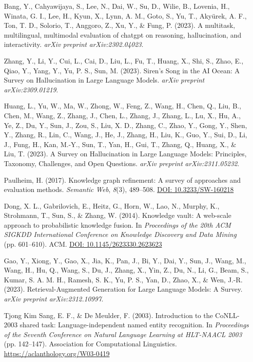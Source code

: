 \documentclass{article}
\begin{document}
\begin{thebibliography}{99}
Bang, Y., Cahyawijaya, S., Lee, N., Dai, W., Su, D., Wilie, B., Lovenia, H., Winata, G. I., Lee, H., Kyun, X., Lynn, A. M., Goto, S., Yu, T., Akyürek, A. F., Ton, T. D., Solorio, T., Anggoro, Z., Xu, Y., \& Fung, P. (2023).
A multitask, multilingual, multimodal evaluation of chatgpt on reasoning, hallucination, and interactivity.
\textit{arXiv preprint arXiv:2302.04023}.

Zhang, Y., Li, Y., Cui, L., Cai, D., Liu, L., Fu, T., Huang, X., Shi, S., Zhao, E., Qiao, Y., Yang, Y., Yu, P. S., Sun, M. (2023).
Siren's Song in the {AI} Ocean: A Survey on Hallucination in Large Language Models.
\textit{arXiv preprint arXiv:2309.01219}.

Huang, L., Yu, W., Ma, W., Zhong, W., Feng, Z., Wang, H., Chen, Q., Liu, B., Chen, M., Wang, Z., Zhang, J., Chen, L., Zhang, J., Zhang, L., Lu, X., Hu, A., Ye, Z., Du, Y., Sun, J., Zou, S., Liu, X. D., Zhang, C., Zhao, Y., Gong, Y., Shen, Y., Zhang, R., Lin, C., Wang, J., He, J., Zhang, H., Liu, K., Guo, Y., Sui, D., Li, J., Fung, H., Kan, M.-Y., Sun, T., Yan, H., Gui, T., Zhang, Q., Huang, X., \& Liu, T. (2023).
A Survey on Hallucination in Large Language Models: Principles, Taxonomy, Challenges, and Open Questions.
\textit{arXiv preprint arXiv:2311.05232}.

Paulheim, H. (2017).
Knowledge graph refinement: A survey of approaches and evaluation methods.
\textit{Semantic Web}, \textit{8}(3), 489--508.
\href{https://doi.org/10.3233/SW-160218}{DOI: 10.3233/SW-160218}

Dong, X. L., Gabrilovich, E., Heitz, G., Horn, W., Lao, N., Murphy, K., Strohmann, T., Sun, S., \& Zhang, W. (2014).
Knowledge vault: A web-scale approach to probabilistic knowledge fusion.
In \textit{Proceedings of the 20th ACM SIGKDD International Conference on Knowledge Discovery and Data Mining} (pp. 601--610). ACM.
\href{https://doi.org/10.1145/2623330.2623623}{DOI: 10.1145/2623330.2623623}

Gao, Y., Xiong, Y., Gao, X., Jia, K., Pan, J., Bi, Y., Dai, Y., Sun, J., Wang, M., Wang, H., Hu, Q., Wang, S., Du, J., Zhang, X., Yin, Z., Du, N., Li, G., Beam, S., Kumar, S. A. M. H., Ramesh, S. K., Yu, P. S., Yan, D., Zhao, X., \& Wen, J.-R. (2023).
Retrieval-Augmented Generation for Large Language Models: A Survey.
\textit{arXiv preprint arXiv:2312.10997}.

Tjong Kim Sang, E. F., \& De Meulder, F. (2003).
Introduction to the CoNLL-2003 shared task: Language-independent named entity recognition.
In \textit{Proceedings of the Seventh Conference on Natural Language Learning at HLT-NAACL 2003} (pp. 142--147). Association for Computational Linguistics.
\url{https://aclanthology.org/W03-0419}


\end{thebibliography}
\end{document}
